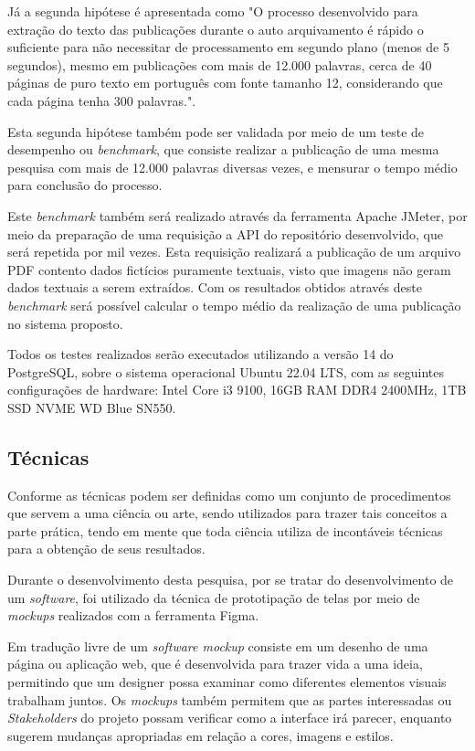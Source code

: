 Já a segunda hipótese é apresentada como "O processo desenvolvido
para extração do texto das publicações durante o auto arquivamento
é rápido o suficiente para não necessitar de processamento em segundo
plano (menos de 5 segundos), mesmo em publicações com mais de 12.000 palavras,
cerca de 40 páginas de puro texto em português com fonte tamanho 12, considerando
que cada página tenha 300 palavras.".

Esta segunda hipótese também pode ser validada por meio de um teste de desempenho
ou \emph{benchmark}, que consiste realizar a publicação de uma mesma pesquisa
com mais de 12.000 palavras diversas vezes, e mensurar o tempo médio para conclusão
do processo.

Este \emph{benchmark} também será realizado através da ferramenta Apache JMeter,
por meio da preparação de uma requisição a API do repositório desenvolvido, que será
repetida por mil vezes. Esta requisição realizará a publicação de um arquivo PDF contento dados
fictícios puramente textuais, visto que imagens não geram dados textuais a serem extraídos.
Com os resultados obtidos através deste \emph{benchmark} será possível calcular o tempo médio
da realização de uma publicação no sistema proposto.

Todos os testes realizados serão executados utilizando
a versão 14 do PostgreSQL, sobre o sistema operacional Ubuntu 22.04 LTS,
com as seguintes configurações de hardware: Intel Core i3 9100, 16GB RAM DDR4 2400MHz,
1TB SSD NVME WD Blue SN550.

\subsection{Técnicas}

Conforme \citep[p. 174]{LAKATOS2003:metodologia} as técnicas podem
ser definidas como um conjunto de procedimentos que servem a
uma ciência ou arte, sendo utilizados para trazer tais
conceitos a parte prática, tendo em mente que toda ciência utiliza
de incontáveis técnicas para a obtenção de seus resultados.

Durante o desenvolvimento desta pesquisa, por se tratar do
desenvolvimento de um \emph{software}, foi utilizado da técnica
de prototipação de telas por meio de \emph{mockups} realizados
com a ferramenta Figma.

Em tradução livre de \cite{uzayr:mockups} um \emph{software mockup}
consiste em um desenho de uma página ou aplicação web,
que é desenvolvida para trazer vida a uma ideia, permitindo
que um designer possa examinar como diferentes elementos visuais
trabalham juntos. Os \emph{mockups} também permitem que as partes
interessadas ou \emph{Stakeholders} do projeto possam verificar como a
interface irá parecer, enquanto sugerem mudanças
apropriadas em relação a cores, imagens e estilos.

